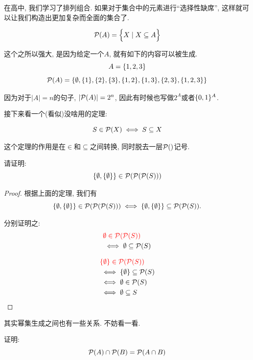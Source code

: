 在高中, 我们学习了排列组合. 如果对于集合中的元素进行``选择性缺席'', 这样就可以让我们构造出更加复杂而全面的集合了. 

\begin{definition}[幂集 (Powerset)]
  \[
    \mathcal{P}(A) = \Big\{X \mid X \subseteq A\Big\}
  \]
\end{definition}

这个之所以强大, 是因为给定一个$A$, 就有如下的内容可以被生成. 
  \[
    A = \{1, 2, 3\}
  \]
  \[
    \mathcal{P}(A) = \{\emptyset,
      \{1\}, \{2\}, \{3\},
      \{1, 2\}, \{1, 3\}, \{2, 3\},
      \{1, 2, 3\}\}
  \]

因为对于$|A| = n$的句子, $|\mathcal{P}(A)| = 2^{n}$, 因此有时候也写做$2^{A}$或者$\{0,1\}^{A}$. 

接下来看一个(看似)没啥用的定理: 

\begin{theorem}
  $$S \in \mathcal{P}(X) \iff S \subseteq X$$
\end{theorem}

这个定理的作用是在$\in$和$\subseteq$之间转换, 同时脱去一层$\mathcal{P}()$记号. 

\begin{eg}
  请证明: 
  $$\{\emptyset, \{\emptyset\}\} \in \mathcal{P}(\mathcal{P}(\mathcal{P}(S)))$$
\end{eg}

\begin{proof}
  根据上面的定理, 我们有
  $$\{\emptyset, \{\emptyset\}\} \in \mathcal{P}(\mathcal{P}(\mathcal{P}(S))) \iff \{\emptyset, \{\emptyset\}\} \subseteq \mathcal{P}(\mathcal{P}(S)).$$

  分别证明之: 
  \begin{align*}
    &\textcolor{red}{\emptyset \in \mathcal{P}(\mathcal{P}(S))}\\
    &\iff \emptyset \subseteq \mathcal{P}(S)
  \end{align*}

  \begin{align*}
    &\textcolor{red}{\{\emptyset\} \in \mathcal{P}(\mathcal{P}(S))}\\
    &\iff \{\emptyset\} \subseteq \mathcal{P}(S)\\
    &\iff \emptyset \in \mathcal{P}(S)\\
    &\iff \emptyset \subseteq S
  \end{align*}

\end{proof}

其实幂集生成之间也有一些关系. 不妨看一看. 

\begin{theorem}
  证明: 
  \[
      \mathcal{P}(A) \cap \mathcal{P}(B) = \mathcal{P}(A \cap B)
  \]
\end{theorem}

